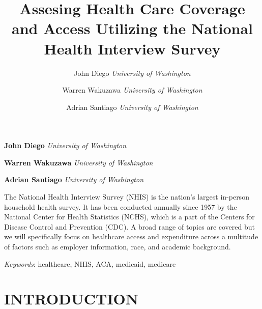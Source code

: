 \documentclass[10pt,]{article}
\title{Assesing Health Care Coverage and Access Utilizing the National Health
Interview Survey  }
\author{\Large John Diego\vspace{0.05in} \newline\normalsize\emph{University of Washington}   \and \Large Warren Wakuzawa\vspace{0.05in} \newline\normalsize\emph{University of Washington}   \and \Large Adrian Santiago\vspace{0.05in} \newline\normalsize\emph{University of Washington}  }
\date{}
\newcommand*{\authorfont}{\fontfamily{phv}\selectfont}
\renewenvironment{abstract}
 {{%
    \setlength{\leftmargin}{0mm}
    \setlength{\rightmargin}{\leftmargin}%
  }%
  \relax}
 {\endlist}
\begin{document}
	
%

{%
\setlength{\parindent}{0pt}
\thispagestyle{plain}
{\fontsize{18}{20}\selectfont\raggedright 
\maketitle  %

}

{
   \vskip 13.5pt\relax \normalsize\fontsize{11}{12} 
\textbf{\authorfont John Diego} \hskip 15pt \emph{\small University of Washington}   \par \textbf{\authorfont Warren Wakuzawa} \hskip 15pt \emph{\small University of Washington}   \par \textbf{\authorfont Adrian Santiago} \hskip 15pt \emph{\small University of Washington}   

}

}







\begin{abstract}

    \hbox{\vrule height .2pt width 39.14pc}

    \vskip 8.5pt %

\noindent The National Health Interview Survey (NHIS) is the nation's largest
in-person household health survey. It has been conducted annually since
1957 by the National Center for Health Statistics (NCHS), which is a
part of the Centers for Disease Control and Prevention (CDC). A broad
range of topics are covered but we will specifically focus on healthcare
access and expenditure across a multitude of factors such as employer
information, race, and academic background.


\vskip 8.5pt \noindent \emph{Keywords}: healthcare, NHIS, ACA, medicaid, medicare \par

    \hbox{\vrule height .2pt width 39.14pc}



\end{abstract}


\vskip 6.5pt

\noindent  \section{INTRODUCTION}\label{introduction}
\end{document}
